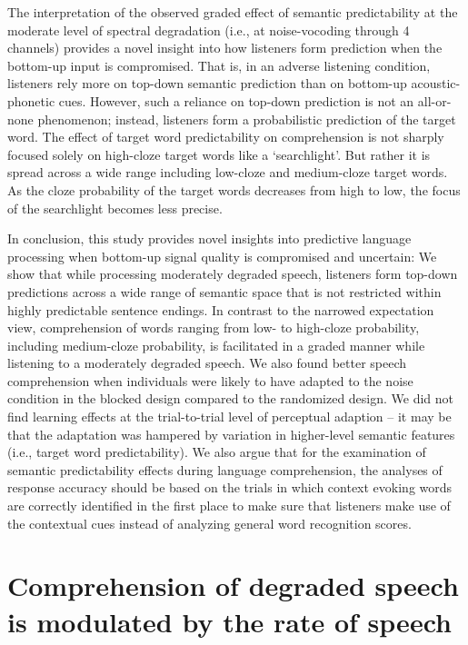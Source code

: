 \documentclass[a4paper, nobind]{templates/ociamthesis}
\begin{document}
The interpretation of the observed graded effect of semantic predictability at the moderate level of spectral degradation (i.e., at noise-vocoding through 4 channels) provides a novel insight into how listeners form prediction when the bottom-up input is compromised.
That is, in an adverse listening condition, listeners rely more on top-down semantic prediction than on bottom-up acoustic-phonetic cues.
However, such a reliance on top-down prediction is not an all-or-none phenomenon; instead, listeners form a probabilistic prediction of the target word.
The effect of target word predictability on comprehension is not sharply focused solely on high-cloze target words like a `searchlight'.
But rather it is spread across a wide range including low-cloze and medium-cloze target words. As the cloze probability of the target words decreases from high to low, the focus of the searchlight becomes less precise.

In conclusion, this study provides novel insights into predictive language processing when bottom-up signal quality is compromised and uncertain:
We show that while processing moderately degraded speech, listeners form top-down predictions across a wide range of semantic space that is not restricted within highly predictable sentence endings.
In contrast to the narrowed expectation view, comprehension of words ranging from low- to high-cloze probability, including medium-cloze probability, is facilitated in a graded manner while listening to a moderately degraded speech.
We also found better speech comprehension when individuals were likely to have adapted to the noise condition in the blocked design compared to the randomized design.
We did not find learning effects at the trial-to-trial level of perceptual adaption -- it may be that the adaptation was hampered by variation in higher-level semantic features (i.e., target word predictability).
We also argue that for the examination of semantic predictability effects during language comprehension, the analyses of response accuracy should be based on the trials in which context evoking words are correctly identified in the first place to make sure that listeners make use of the contextual cues instead of analyzing general word recognition scores.

\hypertarget{comprehension-of-degraded-speech-is-modulated-by-the-rate-of-speech}{%
\chapter{Comprehension of degraded speech is modulated by the rate of speech}\label{comprehension-of-degraded-speech-is-modulated-by-the-rate-of-speech}}
\end{document}

